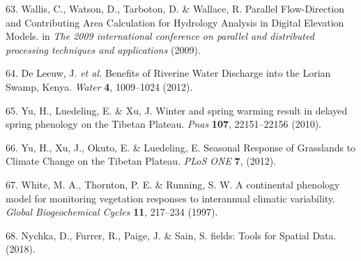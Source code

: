 \documentclass[12pt,oneside]{article}
\begin{document}
\leavevmode\hypertarget{ref-Wallis_et_al_2009}{}%
63. Wallis, C., Watson, D., Tarboton, D. \& Wallace, R. Parallel
Flow-Direction and Contributing Area Calculation for Hydrology Analysis
in Digital Elevation Models. in \emph{The 2009 international conference
on parallel and distributed processing techniques and applications}
(2009).

\leavevmode\hypertarget{ref-DeLeeuw_et_al_2012}{}%
64. De Leeuw, J. \emph{et al.} Benefits of Riverine Water Discharge into
the Lorian Swamp, Kenya. \emph{Water} \textbf{4}, 1009--1024 (2012).

\leavevmode\hypertarget{ref-Yu_et_al_2010}{}%
65. Yu, H., Luedeling, E. \& Xu, J. Winter and spring warming result in
delayed spring phenology on the Tibetan Plateau. \emph{Pnas}
\textbf{107}, 22151--22156 (2010).

\leavevmode\hypertarget{ref-Yu_et_al_2012}{}%
66. Yu, H., Xu, J., Okuto, E. \& Luedeling, E. Seasonal Response of
Grasslands to Climate Change on the Tibetan Plateau. \emph{PLoS ONE}
\textbf{7}, (2012).

\leavevmode\hypertarget{ref-White_et_al_1997}{}%
67. White, M. A., Thornton, P. E. \& Running, S. W. A continental
phenology model for monitoring vegetation responses to interannual
climatic variability. \emph{Global Biogeochemical Cycles} \textbf{11},
217--234 (1997).

\leavevmode\hypertarget{ref-Nychka_et_al_2018}{}%
68. Nychka, D., Furrer, R., Paige, J. \& Sain, S. fields: Tools for
Spatial Data. (2018).
\end{document}
